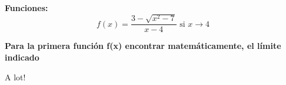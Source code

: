 \documentclass[answers]{exam} %
\begin{document}

\large\textbf{Funciones:}
\[
    f(x)=\frac{3-\sqrt{x^2-7}}{x-4} \text{ si } x \rightarrow 4
\]


\begin{questions}

    \question \large\textbf{Para la primera función f(x) encontrar matemáticamente, el límite indicado}
    \begin{solution}
        A lot!
    \end{solution}

    \vspace{0.5cm}


\end{questions}
\end{document}
